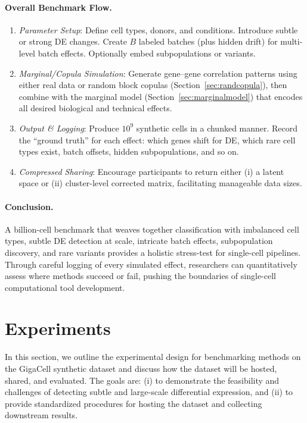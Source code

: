 \documentclass{article}
\begin{document}
\paragraph{Overall Benchmark Flow.}
\begin{enumerate}
	\item \emph{Parameter Setup}: Define cell types, donors, and conditions. Introduce subtle or strong DE changes. Create $B$ labeled batches (plus hidden drift) for multi-level batch effects. Optionally embed subpopulations or variants.
	\item \emph{Marginal/Copula Simulation}: Generate gene--gene correlation patterns using either real data or random block copulas (Section~\ref{sec:randcopula}), then combine with the marginal model (Section~\ref{sec:marginalmodel}) that encodes all desired biological and technical effects.
	\item \emph{Output \& Logging}: Produce $10^9$ synthetic cells in a chunked manner. Record the “ground truth” for each effect: which genes shift for DE, which rare cell types exist, batch offsets, hidden subpopulations, and so on.
	\item \emph{Compressed Sharing}: Encourage participants to return either (i) a latent space or (ii) cluster-level corrected matrix, facilitating manageable data sizes. 
\end{enumerate}

\paragraph{Conclusion.}
A billion-cell benchmark that weaves together classification with imbalanced cell types, subtle DE detection at scale, intricate batch effects, subpopulation discovery, and rare variants provides a holistic stress-test for single-cell pipelines. Through careful logging of every simulated effect, researchers can quantitatively assess where methods succeed or fail, pushing the boundaries of single-cell computational tool development.



\section{Experiments}
\label{sec:experiments}

In this section, we outline the experimental design for benchmarking methods on the GigaCell synthetic dataset and discuss how the dataset will be hosted, shared, and evaluated. The goals are: (i) to demonstrate the feasibility and challenges of detecting subtle and large-scale differential expression, and (ii) to provide standardized procedures for hosting the dataset and collecting downstream results.
\end{document}
